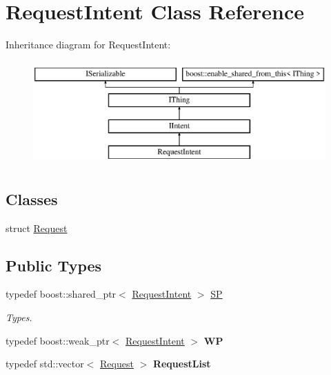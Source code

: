\hypertarget{class_request_intent}{}\section{Request\+Intent Class Reference}
\label{class_request_intent}
Inheritance diagram for Request\+Intent\+:\begin{figure}[H]
\begin{center}
\leavevmode
\includegraphics[height=4.000000cm]{class_request_intent}
\end{center}
\end{figure}
\subsection*{Classes}
\begin{DoxyCompactItemize}
\item 
struct \hyperlink{struct_request_intent_1_1_request}{Request}
\end{DoxyCompactItemize}
\subsection*{Public Types}
\begin{DoxyCompactItemize}
\item 
\mbox{\label{class_request_intent_a60d08b72bbc1d35371b5d42b85215478}} 
typedef boost\+::shared\+\_\+ptr$<$ \hyperlink{class_request_intent}{Request\+Intent} $>$ \hyperlink{class_request_intent_a60d08b72bbc1d35371b5d42b85215478}{SP}
\begin{DoxyCompactList}\small\item\em Types. \end{DoxyCompactList}\item 
\mbox{\label{class_request_intent_ae0d51c0901019922485d49adc4b3c5ac}} 
typedef boost\+::weak\+\_\+ptr$<$ \hyperlink{class_request_intent}{Request\+Intent} $>$ {\bfseries WP}
\item 
\mbox{\label{class_request_intent_a4e406f546ed2ca83334f8ff5d14f8875}} 
typedef std\+::vector$<$ \hyperlink{struct_request_intent_1_1_request}{Request} $>$ {\bfseries Request\+List}
\end{DoxyCompactItemize}

